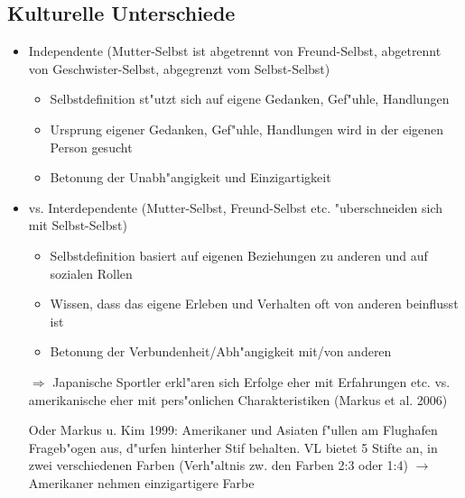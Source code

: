 \subsection{Kulturelle Unterschiede}
\begin{itemize}
	\item
		Independente (Mutter-Selbst ist abgetrennt von Freund-Selbst, abgetrennt von Geschwister-Selbst, abgegrenzt vom Selbst-Selbst) 
		\begin{itemize}
			\item
				Selbstdefinition st"utzt sich auf eigene Gedanken, Gef"uhle, Handlungen
			\item
				Ursprung eigener Gedanken, Gef"uhle, Handlungen wird in der eigenen Person gesucht
			\item
				Betonung der Unabh"angigkeit und Einzigartigkeit
		\end{itemize}
	\item
		vs. Interdependente (Mutter-Selbst, Freund-Selbst etc. "uberschneiden sich mit Selbst-Selbst)
		\begin{itemize}
			\item
				Selbstdefinition basiert auf eigenen Beziehungen zu anderen und auf sozialen Rollen
			\item
				Wissen, dass das eigene Erleben und Verhalten oft von anderen beinflusst ist
			\item
				Betonung der Verbundenheit/Abh"angigkeit mit/von anderen
		\end{itemize}
		$\Rightarrow$ Japanische Sportler erkl"aren sich Erfolge eher mit Erfahrungen etc. vs. amerikanische eher mit pers"onlichen Charakteristiken (Markus et al. 2006)

		Oder Markus u. Kim 1999: Amerikaner und Asiaten f"ullen am Flughafen Frageb"ogen aus, d"urfen hinterher Stif behalten. VL bietet 5 Stifte an, in zwei verschiedenen Farben (Verh"altnis zw. den Farben 2:3 oder 1:4)  $\rightarrow$ Amerikaner nehmen einzigartigere Farbe
\end{itemize}

